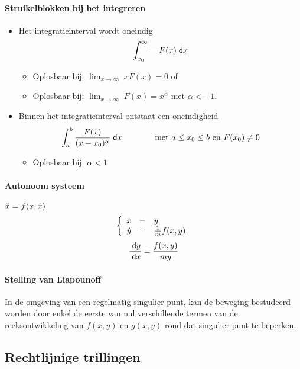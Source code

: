 \paragraph{Struikelblokken bij het integreren}
\begin{itemize}
  \item Het integratieinterval wordt oneindig
        \[
          \int^{\infty}_{x_0} = F(x) \;\textsf{d}x
        \]
        \begin{itemize}
          \item Oplosbaar bij: $\lim_{x \to \infty}\; x F(x) = 0$ of
          \item Oplosbaar bij: $\lim_{x \to \infty}\; F(x) = x^\alpha$ met $\alpha < -1$.
        \end{itemize}
  \item Binnen het integratieinterval ontstaat een oneindigheid
        \[
          \int^b_a \frac{F(x)}{(x-x_0)^\alpha} \;\textsf{d}x  \qquad \qquad \mbox{met } a \leq x_0 \leq b \mbox{ en } F(x_0) \neq 0
        \]
        \begin{itemize}
          \item Oplosbaar bij: $\alpha < 1$
        \end{itemize}
\end{itemize}

\paragraph{Autonoom systeem} $\ddot{x} = f(x,\dot{x})$
\[
  \left\{
    \begin{array}{rcl}
	    \dot{x} & = & y\\
	    \dot{y} & = & \frac{1}{m} f(x,y)
    \end{array}
  \right.
\]
\[
  \frac{\;\textsf{d}y}{\;\textsf{d}x} = \frac{f(x,y)}{my}
\]

\paragraph{Stelling van Liapounoff}
  In de omgeving van een regelmatig singulier punt, kan de beweging bestudeerd worden door enkel de eerste van nul
  verschillende termen van de reeksontwikkeling van $f(x,y)$ en $g(x,y)$ rond dat singulier punt te beperken.
  
  

\subsection{Rechtlijnige trillingen}
\label{sec:RechtlTril}


